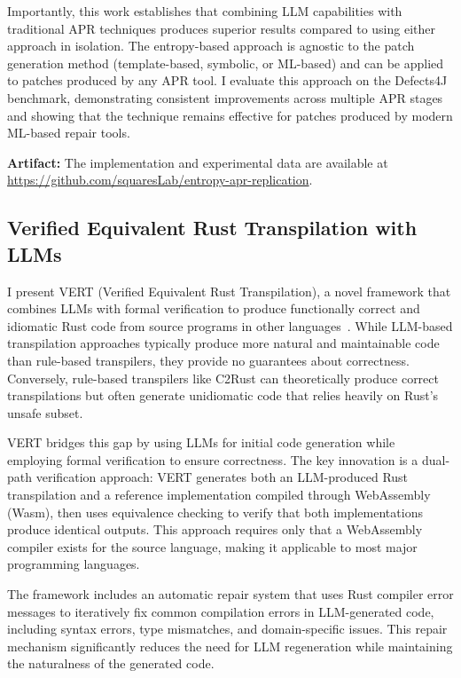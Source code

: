 \documentclass[12pt,openany,oneside,table]{cmuthesis}
\begin{document}
Importantly, this work establishes that combining LLM capabilities with traditional APR techniques produces superior results compared to using either approach in isolation. The entropy-based approach is agnostic to the patch generation method (template-based, symbolic, or ML-based) and can be applied to patches produced by any APR tool. I evaluate this approach on the Defects4J benchmark, demonstrating consistent improvements across multiple APR stages and showing that the technique remains effective for patches produced by modern ML-based repair tools.

\textbf{Artifact:} The implementation and experimental data are available at \url{https://github.com/squaresLab/entropy-apr-replication}.

\subsection{Verified Equivalent Rust Transpilation with LLMs}

I present VERT (Verified Equivalent Rust Transpilation), a novel framework that combines LLMs with formal verification to produce functionally correct and idiomatic Rust code from source programs in other languages~\cite{vert}. While LLM-based transpilation approaches typically produce more natural and maintainable code than rule-based transpilers, they provide no guarantees about correctness. Conversely, rule-based transpilers like C2Rust can theoretically produce correct transpilations but often generate unidiomatic code that relies heavily on Rust's unsafe subset.

VERT bridges this gap by using LLMs for initial code generation while employing formal verification to ensure correctness. The key innovation is a dual-path verification approach: VERT generates both an LLM-produced Rust transpilation and a reference implementation compiled through WebAssembly (Wasm), then uses equivalence checking to verify that both implementations produce identical outputs. This approach requires only that a WebAssembly compiler exists for the source language, making it applicable to most major programming languages.

The framework includes an automatic repair system that uses Rust compiler error messages to iteratively fix common compilation errors in LLM-generated code, including syntax errors, type mismatches, and domain-specific issues. This repair mechanism significantly reduces the need for LLM regeneration while maintaining the naturalness of the generated code.
\end{document}
